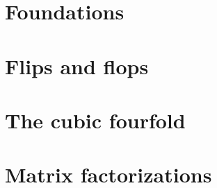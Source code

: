 \section{Foundations}

\newpage

\section{Flips and flops}

\newpage

\section{The cubic fourfold}

\newpage

\section{Matrix factorizations}

\newpage
